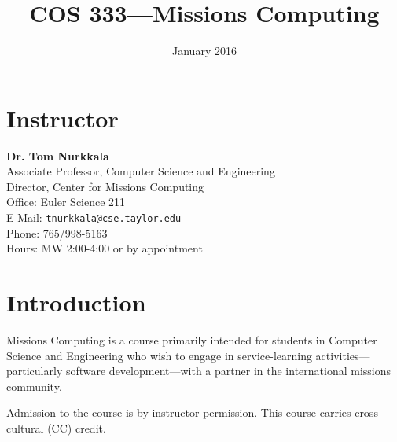 \documentclass{article}
\date{January 2016}
\title{COS 333---Missions Computing}
\renewcommand\maketitle\relax
\begin{document}
\maketitle

\section{Instructor}
\label{sec:orgheadline1}
\textbf{Dr. Tom Nurkkala}\\
Associate Professor, Computer Science and Engineering\\
Director, Center for Missions Computing\\
Office: Euler Science 211\\
E-Mail: \texttt{tnurkkala@cse.taylor.edu}\\
Phone: 765/998-5163\\
Hours: MW 2:00-4:00 or by appointment\\
\section{Introduction}
\label{sec:orgheadline2}
Missions Computing is a course primarily intended for students in Computer Science and
Engineering who wish to engage in service-learning activities—particularly software
development—with a partner in the international missions community.

Admission to the course is by instructor permission.
This course carries cross cultural (CC) credit.
\end{document}
